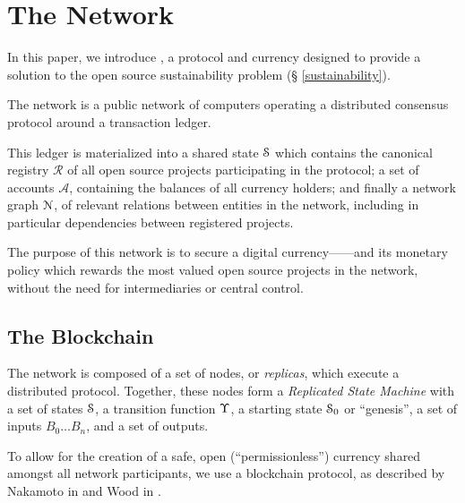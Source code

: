 \section{The \oscoin{} Network}



\noindent In this paper, we introduce \oscoin{}, a protocol and currency
designed to provide a solution to the open source sustainability problem (\S
\ref{sustainability}).

The \oscoin{} network is a public network of computers operating a distributed
consensus protocol around a transaction ledger.

This ledger is materialized into a shared state $\mathcal{S}$ which
contains the canonical registry $\mathcal{R}$ of all open source
projects participating in the \oscoin{} protocol; a set of accounts
$\mathcal{A}$, containing the balances of all currency holders; and
finally a network graph $\mathcal{N}$, of relevant relations between
entities in the network, including in particular dependencies between
registered projects.

The purpose of this network is to secure a digital
currency---\oscoin{}---and its monetary policy which rewards the most
valued open source projects in the network, without the need for
intermediaries or central control.

\subsection{The \oscoin{} Blockchain}

The \oscoin{} network is composed of a set of nodes, or \emph{replicas}, which
execute a distributed protocol. Together, these nodes form a \emph{Replicated
State Machine} with a set of states $\mathcal{S}$, a transition function $\Upsilon$,
a starting state $\mathcal{S}_0$ or ``genesis'', a set of inputs $B_0 \dotso B_n$,
and a set of outputs.

To allow for the creation of a safe, open (``permissionless'') currency shared
amongst all network participants, we use a blockchain protocol, as described by
Nakamoto in \cite{bitcoin} and Wood in \cite{ethreum}.


